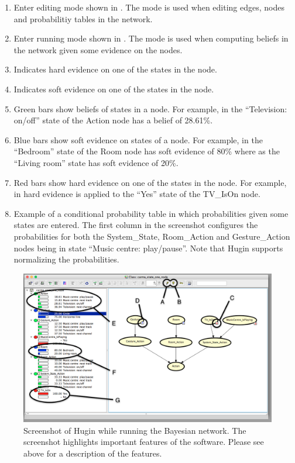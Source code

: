 \begin{enumerate}[label=\Alph*.]
\item Enter editing mode shown in . The mode is used when editing edges, nodes and probabilitiy tables in the network.
\item Enter running mode shown in . The mode is used when computing beliefs in the network given some evidence on the nodes.
\item Indicates hard evidence on one of the states in the node.
\item Indicates soft evidence on one of the states in the node.
\item Green bars show beliefs of states in a node. For example, in  the ``Television: on/off'' state of the Action node has a belief of 28.61\%.
\item Blue bars show soft evidence on states of a node. For example, in  the ``Bedroom'' state of the Room node has soft evidence of 80\% where as the ``Living room'' state has soft evidence of 20\%.
\item Red bars show hard evidence on one of the states in the node. For example, in  hard evidence is applied to the ``Yes'' state of the TV\_IsOn node.
\item Example of a conditional probability table in which probabilities given some states are entered. The first column in the screenshot configures the probabilities for both the System\_State, Room\_Action and Gesture\_Action nodes being in state ``Music centre: play/pause''. Note that Hugin supports normalizing the probabilities.
\end{enumerate}

\begin{figure}[h!]
\centering
\includegraphics[width=\textwidth]{images/hugin-functionality-running}
\caption{Screenshot of Hugin while running the Bayesian network. The screenshot highlights important features of the software. Please see above for a description of the features.}
\label{fig:design:bayesian-network:hugin-functionality-running}
\end{figure}


